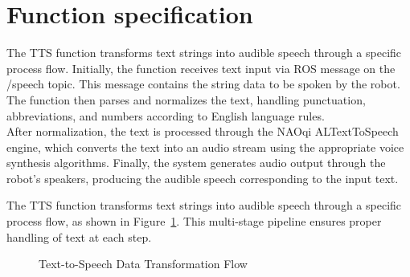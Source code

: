 \documentclass{CSSRforAfrica}
\begin{document}
\newpage
\section{Function specification}

The TTS function transforms text strings into audible speech through a specific process flow. Initially, the function receives text input via ROS message on the /speech topic. This message contains the string data to be spoken by the robot. The function then parses and normalizes the text, handling punctuation, abbreviations, and numbers according to English language rules.\\
After normalization, the text is processed through the NAOqi ALTextToSpeech engine, which converts the text into an audio stream using the appropriate voice synthesis algorithms. Finally, the system generates audio output through the robot's speakers, producing the audible speech corresponding to the input text.

The TTS function transforms text strings into audible speech through a specific process flow, as shown in Figure~\ref{fig:tts-dataflow}. This multi-stage pipeline ensures proper handling of text at each step.

\usetikzlibrary{positioning, calc, arrows.meta}
\begin{figure}[htbp]
    \centering
    \caption{Text-to-Speech Data Transformation Flow}
    \label{fig:tts-dataflow}
\end{figure}
\end{document}
